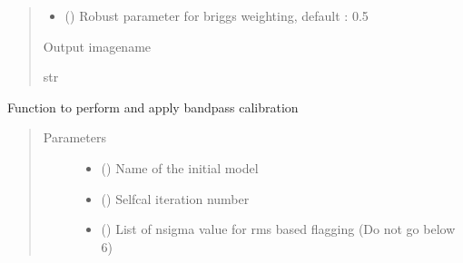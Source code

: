 \documentclass[letterpaper,10pt,english]{sphinxmanual}
\begin{document}
\begin{fulllineitems}
\begin{fulllineitems}
\begin{quote}
\begin{description}
\begin{itemize}
\item {} 
\sphinxAtStartPar
{} () \textendash{} Robust parameter for briggs weighting, default : 0.5

\end{itemize}

\item[{Returns}] \leavevmode
\sphinxAtStartPar
Output imagename

\item[{Return type}] \leavevmode
\sphinxAtStartPar
str

\end{description}\end{quote}

\end{fulllineitems}


\begin{fulllineitems}
\label{\detokenize{paircars:paircars.intensity_selfcal_LTS.IntensitySelfcal.initial_bpass}}
\sphinxAtStartPar
Function to perform and apply bandpass calibration
\begin{quote}\begin{description}
\item[{Parameters}] \leavevmode\begin{itemize}
\item {} 
\sphinxAtStartPar
{} () \textendash{} Name of the initial model

\item {} 
\sphinxAtStartPar
{} () \textendash{} Selfcal iteration number

\item {} 
\sphinxAtStartPar
{} () \textendash{} List of n\sphinxhyphen{}sigma value for rms based flagging (Do not go below 6)


\end{itemize}
\end{description}
\end{quote}
\end{fulllineitems}
\end{fulllineitems}
\end{document}

